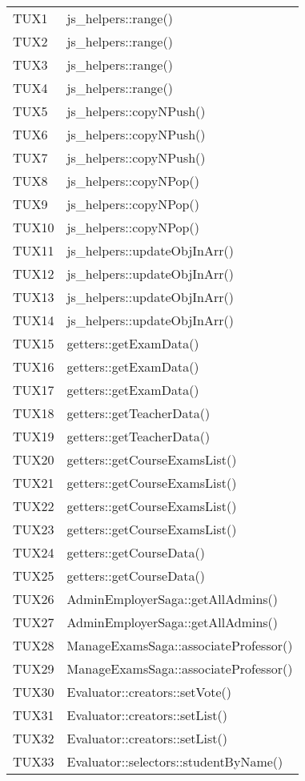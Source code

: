 \documentclass[PianoDiQualifica.tex]{subfiles}
\begin{document}
\begin{longtable}[H]{P{5cm}P{9cm}}
	\hhline{==}
	TUX1 & js\_helpers::range() \\
	TUX2 & js\_helpers::range() \\
	TUX3 & js\_helpers::range() \\
	TUX4 & js\_helpers::range() \\
	TUX5 & js\_helpers::copyNPush() \\
	TUX6 & js\_helpers::copyNPush() \\
	TUX7 & js\_helpers::copyNPush() \\
	TUX8 & js\_helpers::copyNPop() \\
	TUX9 & js\_helpers::copyNPop() \\
	TUX10 & js\_helpers::copyNPop() \\
	TUX11 & js\_helpers::updateObjInArr() \\
	TUX12 & js\_helpers::updateObjInArr() \\
	TUX13 & js\_helpers::updateObjInArr() \\
	TUX14 & js\_helpers::updateObjInArr() \\
	TUX15 & getters::getExamData() \\
	TUX16 & getters::getExamData() \\
	TUX17 & getters::getExamData() \\
	TUX18 & getters::getTeacherData() \\
	TUX19 & getters::getTeacherData() \\
	TUX20 & getters::getCourseExamsList() \\
	TUX21 & getters::getCourseExamsList() \\
	TUX22 & getters::getCourseExamsList() \\
	TUX23 & getters::getCourseExamsList() \\
	TUX24 & getters::getCourseData() \\
	TUX25 & getters::getCourseData() \\
	TUX26 & AdminEmployerSaga::getAllAdmins() \\
	TUX27 & AdminEmployerSaga::getAllAdmins() \\
	TUX28 & ManageExamsSaga::associateProfessor() \\
	TUX29 & ManageExamsSaga::associateProfessor() \\
	TUX30 & Evaluator::creators::setVote() \\
	TUX31 & Evaluator::creators::setList() \\
	TUX32 & Evaluator::creators::setList() \\
	TUX33 & Evaluator::selectors::studentByName() \\

\end{longtable}
\end{document}
